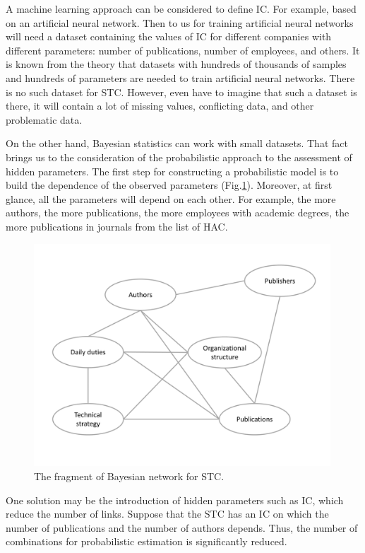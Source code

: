 \documentclass[12pt]{report}
\theoremstyle{definition}
\begin{document}
A machine learning approach can be considered to define IC. 
For example, based on an artificial neural network. 
Then to us for training artificial neural networks will need a dataset containing the values of IC for different companies with different parameters: number of publications, number of employees, and others.
It is known from the theory that datasets with hundreds of thousands of samples and hundreds of parameters are needed to train artificial neural networks.  
There is no such dataset for STC. 
However, even have to imagine that such a dataset is there, it will contain a lot of missing values, conflicting data, and other problematic data.

On the other hand, Bayesian statistics can work with small datasets. 
That fact brings us to the consideration of the probabilistic approach to the assessment of hidden parameters. 
The first step for constructing a probabilistic model is to build the dependence of the observed parameters (Fig.\ref{fig:bn2}).
Moreover, at first glance, all the parameters will depend on each other. 
For example, the more authors, the more publications, the more employees with academic degrees, the more publications in journals from the list of HAC.

\begin{figure}[ht]
	\centering
	\includegraphics[width=0.99\textwidth]{bn2eng}
	\caption{The fragment of Bayesian network for STC.}
	\label{fig:bn2}
\end{figure}  

One solution may be the introduction of hidden parameters such as IC, which reduce the number of links. 
Suppose that the STC has an IC on which the number of publications and the number of authors depends. 
Thus, the number of combinations for probabilistic estimation is significantly reduced.
\end{document}
